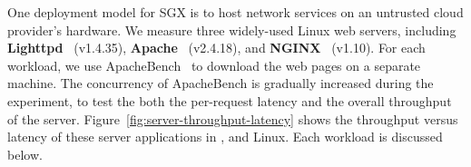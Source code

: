 One deployment model for SGX is to host network services
on an untrusted cloud provider's hardware.
We measure three widely-used Linux web servers, including {\bf Lighttpd}~\cite{lighttpd} (v1.4.35), {\bf Apache}~\cite{apache} (v2.4.18), and {\bf NGINX}~\cite{nginx} (v1.10).
For each workload, we use ApacheBench~\cite{apachebench} to download the web pages on a separate machine.
The concurrency of ApacheBench is gradually increased during the experiment, to test the both the per-request latency and the overall throughput of the server.
Figure~\ref{fig:server-throughput-latency} shows the throughput versus latency of these server applications
in \graphenesgx{}, \graphene{} and Linux. 
Each workload is discussed below.




